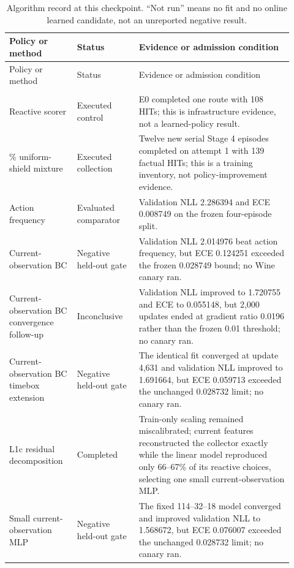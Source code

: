\documentclass[11pt]{article}
\begin{document}
\small
\begin{longtable}{@{}>{\raggedright\arraybackslash}p{0.22\linewidth}
                       >{\raggedright\arraybackslash}p{0.20\linewidth}
                       >{\raggedright\arraybackslash}p{0.50\linewidth}@{}}
\caption{Algorithm record at this checkpoint.  ``Not run'' means no fit and no
online learned candidate, not an unreported negative result.}
\label{tab:algorithm-record}\\
\toprule
Policy or method & Status & Evidence or admission condition \\
\midrule
\endfirsthead
\toprule
Policy or method & Status & Evidence or admission condition \\
\midrule
\endhead
\midrule
\multicolumn{3}{r}{Continued on next page} \\
\endfoot
\bottomrule
\endlastfoot
Reactive scorer & Executed control & E0 completed one route with 108 HITs; this is infrastructure evidence, not a learned-policy result. \\
20\% uniform-shield mixture & Executed collection & Twelve new serial Stage 4 episodes completed on attempt 1 with 139 factual HITs; this is a training inventory, not policy-improvement evidence. \\
Action frequency & Evaluated comparator & Validation NLL 2.286394 and ECE 0.008749 on the frozen four-episode split. \\
Current-observation BC & Negative held-out gate & Validation NLL 2.014976 beat action frequency, but ECE 0.124251 exceeded the frozen 0.028749 bound; no Wine canary ran. \\
Current-observation BC convergence follow-up & Inconclusive & Validation NLL improved to 1.720755 and ECE to 0.055148, but 2,000 updates ended at gradient ratio 0.0196 rather than the frozen 0.01 threshold; no canary ran. \\
Current-observation BC timebox extension & Negative held-out gate & The identical fit converged at update 4,631 and validation NLL improved to 1.691664, but ECE 0.059713 exceeded the unchanged 0.028732 limit; no canary ran. \\
L1c residual decomposition & Completed & Train-only scaling remained miscalibrated; current features reconstructed the collector exactly while the linear model reproduced only 66--67\% of its reactive choices, selecting one small current-observation MLP. \\
Small current-observation MLP & Negative held-out gate & The fixed 114--32--18 model converged and improved validation NLL to 1.568672, but ECE 0.076007 exceeded the unchanged 0.028732 limit; no canary ran. \\

\end{longtable}
\end{document}
